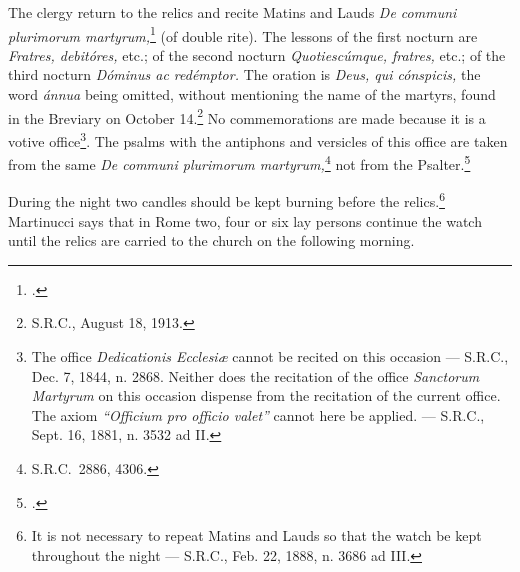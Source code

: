 \documentclass[letterpaper]{report}
\newcommand\src{\textsc{S.R.C.}}
\begin{document}
{    \rubric The clergy return to the relics and recite Matins and Lauds
    \textit{De communi plurimorum martyrum,}\footcite[If the relics are of
    martyrs who have a proper office in the Breviary, e.g., Ss. Vincent and
    Anastasius, Ss. Fabian and Sevastian, etc., the proper office of these
    martyrs may be recited.][n. 21, footnote 2, p. 25.]{consecranda:1956} (of
    double rite). The lessons of the first nocturn are \textit{Fratres,
    debit\'ores,} etc.; of the second nocturn \textit{Quotiesc\'umque,
    fratres,} etc.; of the third nocturn \textit{D\'ominus ac red\'emptor.} The
    oration is \textit{Deus, qui c\'onspicis,} the word \textit{\'annua} being
    omitted, without mentioning the name of the martyrs, found in the Breviary
    on October 14.\footnote{\src, August 18, 1913.} No commemorations are made
    because it is a votive office\footnote{The office \textit{Dedicationis
    Ecclesi\ae} cannot be recited on this occasion --- \src, Dec. 7, 1844, n.
    2868. Neither does the recitation of the office \textit{Sanctorum Martyrum}
    on this occasion dispense from the recitation of the current office. The
    axiom \textit{``Officium pro officio valet''} cannot here be applied. ---
    \src, Sept. 16, 1881, n. 3532 ad II.}. The psalms with the antiphons and
    versicles of this office are taken from the same \textit{De communi
    plurimorum martyrum,}\footnote{\src\ 2886, 4306.} not from the
    Psalter.\footcite[][n. 738.]{ml:1947}

    \rubric During the night two candles should be kept burning before the
    relics.\footnote{It is not necessary to repeat Matins and Lauds so that the
    watch be kept throughout the night --- \src, Feb. 22, 1888, n. 3686 ad
    III.} Martinucci says that in Rome two, four or six lay persons continue
    the watch until the relics are carried to the church on the following
    morning.

}
\end{document}
